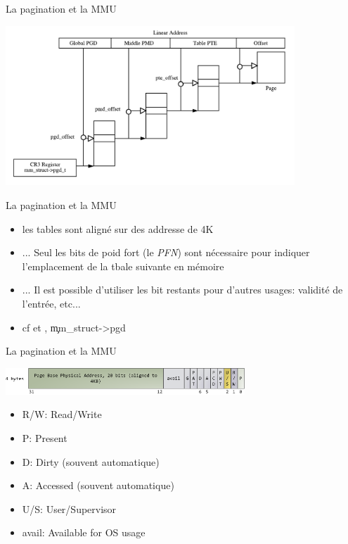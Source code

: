 \begin{frame}{La pagination et la MMU}
  \begin{center}
    \includegraphics[height=6cm]{pics/linearaddress}
  \end{center}
\end{frame}

\begin{frame}{La pagination et la MMU}
  \begin{itemize}
      \item les tables sont aligné sur des addresse de 4K
      \item  ... Seul  les  bits  de poid  fort  (le \emph{PFN})  sont
        nécessaire pour indiquer l'emplacement de la tbale suivante en
        mémoire
      \item  ... Il  est  possible d'utiliser  les  bit restants  pour
        d'autres usages: validité de l'entrée, etc...
      \item          cf                    et
        , \c{mm_struct->pgd}
    \end{itemize}
\end{frame}
    
\begin{frame}{La pagination et la MMU}
    \begin{center}
      \includegraphics[width=9cm]{pics/x86PageTableEntry4KB}
    \end{center}    
  \begin{itemize}
  \item R/W: Read/Write
  \item P: Present
  \item D: Dirty (souvent automatique)
  \item A: Accessed (souvent automatique)
  \item U/S: User/Supervisor
  \item avail: Available for OS usage
    \end{itemize}
\end{frame}

